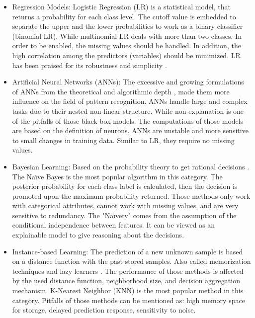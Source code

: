 \begin{itemize}
    \item Regression Models: Logistic Regression (LR) is a statistical model, that returns a probability for each class level. The cutoff value is embedded to separate the upper and the lower probabilities to work as a binary classifier (binomial LR). While multinomial LR deals with more than two classes. In order to be enabled, the missing values should be handled. In addition, the high correlation among the predictors (variables) should be minimized. LR has been praised for its robustness and simplicity \cite{friedman2001}.  \item Artificial Neural Networks (ANNs): The excessive and growing formulations of ANNs from the theoretical and algorithmic depth \cite{carlini2017}, made them more influence on the field of pattern recognition. ANNs handle large and complex tasks due to their nested non-linear structure. While non-explanation is one of the pitfalls of those black-box models.  The computations of those models are based on the definition of neurons. ANNs are unstable and more sensitive to small changes in training data. Similar to LR, they require no missing values.  
    \item Bayesian Learning: Based on the probability theory to get rational decisions \cite{saritas2019}. The Na\"ive Bayes is the most popular algorithm in this category. The posterior probability for each class label is calculated, then the decision is promoted upon the maximum probability returned. Those methods only work with categorical attributes, cannot work with missing values, and are very sensitive to redundancy. The "Na\"ivety" comes from the assumption of the conditional independence between features. It can be viewed as an explainable model to give reasoning about the decisions. 
    \item Instance-based Learning: The prediction of a new unknown sample is based on a distance function with the past stored samples. Also called memorization techniques and lazy learners \cite{lopes2015}. The performance of those methods is affected by the used distance function, neighborhood size, and decision aggregation mechanism. K-Nearest Neighbor (KNN) is the most popular method in this category. Pitfalls of those methods can be mentioned as: high memory space for storage, delayed prediction response, sensitivity to noise.

\end{itemize}
